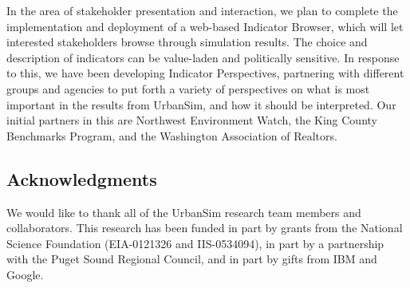 \documentclass{acm_proc_article-sp}
\begin{document}
In the area of stakeholder presentation and interaction, we plan
to complete the implementation and deployment of a web-based
Indicator Browser, which will let interested stakeholders browse
through simulation results.  The choice and description of
indicators can be value-laden and politically sensitive.  In
response to this, we have been developing Indicator
Perspectives, partnering with different groups and agencies to
put forth a variety of perspectives on what is most important in
the results from UrbanSim, and how it should be interpreted.  Our
initial partners in this are Northwest Environment Watch, the King
County Benchmarks Program, and the Washington Association of
Realtors.

\subsection*{Acknowledgments}

We would like to thank all of the UrbanSim research team members and
collaborators.
This research has been funded in part by grants from the
National Science Foundation (EIA-0121326 and IIS-0534094), in part by a
partnership with the Puget Sound Regional Council, and in part by gifts
from IBM and Google.




\end{document}
